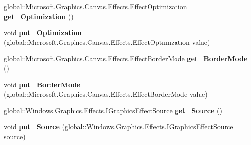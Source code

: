 \begin{DoxyCompactItemize}
\item 
\mbox{\label{class_microsoft_1_1_graphics_1_1_canvas_1_1_effects_1_1_gaussian_blur_effect_aef6c39bc362d054ffa0e6349d24f02cd}} 
global\+::\+Microsoft.\+Graphics.\+Canvas.\+Effects.\+Effect\+Optimization {\bfseries get\+\_\+\+Optimization} ()
\item 
\mbox{\label{class_microsoft_1_1_graphics_1_1_canvas_1_1_effects_1_1_gaussian_blur_effect_af7fd358991e46db4322e11d372de3181}} 
void {\bfseries put\+\_\+\+Optimization} (global\+::\+Microsoft.\+Graphics.\+Canvas.\+Effects.\+Effect\+Optimization value)
\item 
\mbox{\label{class_microsoft_1_1_graphics_1_1_canvas_1_1_effects_1_1_gaussian_blur_effect_a1fe5f86a30992bc3bf2477a872efde7a}} 
global\+::\+Microsoft.\+Graphics.\+Canvas.\+Effects.\+Effect\+Border\+Mode {\bfseries get\+\_\+\+Border\+Mode} ()
\item 
\mbox{\label{class_microsoft_1_1_graphics_1_1_canvas_1_1_effects_1_1_gaussian_blur_effect_af4c57d16f0f76baf8d713b866be1aa8e}} 
void {\bfseries put\+\_\+\+Border\+Mode} (global\+::\+Microsoft.\+Graphics.\+Canvas.\+Effects.\+Effect\+Border\+Mode value)
\item 
\mbox{\label{class_microsoft_1_1_graphics_1_1_canvas_1_1_effects_1_1_gaussian_blur_effect_af0d443d7aeeb6d8541a6d4b8d0a7d372}} 
global\+::\+Windows.\+Graphics.\+Effects.\+I\+Graphics\+Effect\+Source {\bfseries get\+\_\+\+Source} ()
\item 
\mbox{\label{class_microsoft_1_1_graphics_1_1_canvas_1_1_effects_1_1_gaussian_blur_effect_add0eb1e5c62d97e901bb02b01de846c2}} 
void {\bfseries put\+\_\+\+Source} (global\+::\+Windows.\+Graphics.\+Effects.\+I\+Graphics\+Effect\+Source source)
\item 
\mbox{\label{class_microsoft_1_1_graphics_1_1_canvas_1_1_effects_1_1_gaussian_blur_effect_a047fc3cd1ad5bc5aaaeff65c2dab8c8d}} 

\end{DoxyCompactItemize}
